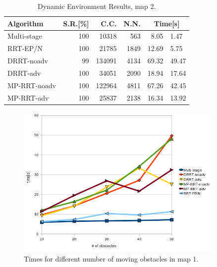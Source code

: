\begin{table}[h!]
\caption{Dynamic Environment Results, map 2.}
\label{table:dynamic2}
\centering
\begin{tabular}{|l||r|r|r|r@{$\ \pm\ $}l|}
\hline
\textbf{Algorithm} & \textbf{S.R.[\%]} & \textbf{C.C.} & \textbf{N.N.} &
\multicolumn{2}{c|}{\textbf{Time[s]}}\\
\hline
Multi-stage & 100 & 10318 & 563 & 8.05 & 1.47\\
\hline
RRT-EP/N & 100 & 21785 & 1849 & 12.69 & 5.75 \\
\hline
DRRT-noadv & 99 & 134091 & 4134 & 69.32 & 49.47\\
\hline
DRRT-adv & 100 & 34051 & 2090 & 18.94 & 17.64\\
\hline
MP-RRT-noadv & 100 & 122964 & 4811 & 67.26 & 42.45\\
\hline
MP-RRT-adv & 100 & 25837 & 2138 & 16.34 & 13.92\\
\hline
\end{tabular}
\end{table}


\begin{figure}[h!]
\begin{center}
\includegraphics[width=0.9\textwidth]{images/times}
\caption[Dynamic environment time]{Times for different number of moving obstacles in map 1.}
\label{fig:times}
\end{center}
\end{figure}

